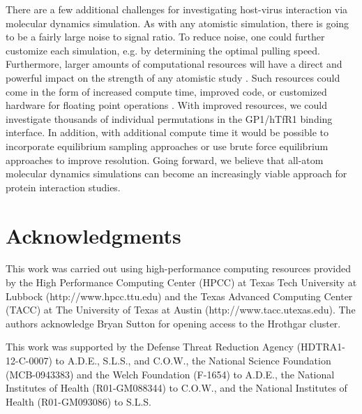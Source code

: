 \documentclass[12pt]{article}
\begin{document}
There are a few additional challenges for investigating host-virus interaction via molecular dynamics simulation. As with any atomistic simulation, there is going to be a fairly large noise to signal ratio. To reduce noise, one could further customize each simulation, e.g. by determining the optimal pulling speed. Furthermore, larger amounts of computational resources will have a direct and powerful impact on the strength of any atomistic study \citep{Shaw2012}. Such resources could come in the form of increased compute time, improved code, or customized hardware for floating point operations \citep{Shaw2011}. With improved resources, we could investigate thousands of individual permutations in the GP1/hTfR1 binding interface. In addition, with additional compute time it would be possible to incorporate equilibrium sampling approaches \citep{Buch2011} or use brute force equilibrium approaches \citep{Giorgino2012} to improve resolution. Going forward, we believe that all-atom molecular dynamics simulations can become an increasingly viable approach for protein interaction studies. 

\section*{Acknowledgments}
This work was carried out using high-performance computing resources provided by the High Performance Computing Center (HPCC) at Texas Tech University at Lubbock (http://www.hpcc.ttu.edu) and the Texas Advanced Computing Center (TACC) at The University of Texas at Austin (http://www.tacc.utexas.edu). The authors acknowledge Bryan Sutton for opening access to the Hrothgar cluster.

This work was supported by the Defense Threat Reduction Agency (HDTRA1-12-C-0007) to A.D.E., S.L.S., and C.O.W., the National Science Foundation (MCB-0943383) and the Welch Foundation (F-1654) to A.D.E., the National Institutes of Health (R01-GM088344) to C.O.W., and the National Institutes of Health (R01-GM093086) to S.L.S.



\end{document}
